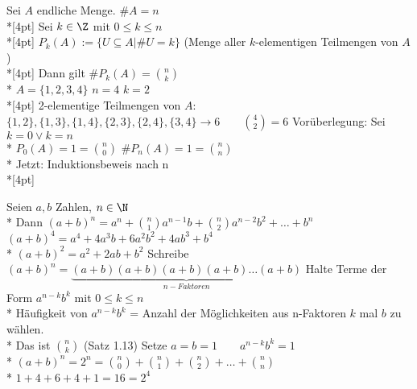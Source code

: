 Sei $A$ endliche Menge. $\#A=n$\\*[4pt]
Sei $k\in\Z$ mit $0\leq k\leq n$\\*[4pt]
$P_k(A):=\{U\subseteq A| \#U=k\}$ (Menge aller $k$-elementigen Teilmengen von $A$)\\*[4pt]
Dann gilt $\#P_k(A)=\binom{n}{k}$\\*
\bsp
$A=\{1,2,3,4\}$ $n=4$ $k=2$\\*[4pt]
2-elementige Teilmengen von $A$:
$\{1,2\}, \{1,3\}, \{1,4\}, \{2,3\}, \{2,4\}, \{3,4\} \to 6\qquad \binom{4}{2}=6$ \ok
%
\bew
Vorüberlegung: Sei $k=0 \vee k=n$\\*
$P_0(A)=1=\binom{n}{0}$ $\#P_n(A)=1=\binom{n}{n}$\ok\\*
Jetzt: Induktionsbeweis nach n\\*[4pt]

Seien $a,b$ Zahlen, $n\in\N$\\*
Dann $(a+b)^n=a^n+\binom{n}{1} a^{n-1} b+\binom{n}{2}a^{n-2}b^2+…+b^n$
%
\bsp
$(a+b)^4=a^4+4a^3b+6a^2b^2+4ab^3+b^4$\\*
$(a+b)^2=a^2+2ab+b^2$
%
\bew
Schreibe $(a+b)^n=\underbrace{(a+b)(a+b)(a+b)(a+b)…(a+b)}_{n-Faktoren}$
%
Halte Terme der Form $a^{n-k}b^k$ mit $0\leq k\leq n$\\*
Häufigkeit von $a^{n-k}b^k$ = Anzahl der Möglichkeiten aus n-Faktoren $k$ mal $b$ zu wählen.\\*
Das ist $\binom{n}{k}$ (Satz 1.13)
%
Setze $a=b=1\qquad a^{n-k}b^k=1$\\*
$(a+b)^n=2^n=\binom{n}{0}+\binom{n}{1}+\binom{n}{2}+…+\binom{n}{n}$\\*
%
\bsp
$1+4+6+4+1=16=2^4$

